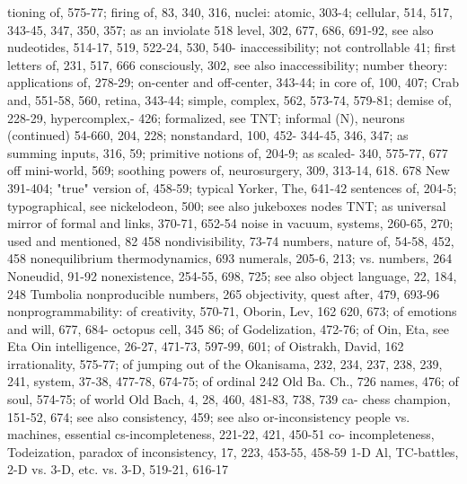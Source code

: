 tioning of, 575-77; firing of, 83, 340, 316,      nuclei: atomic, 303-4; cellular, 514, 517,
343-45, 347, 350, 357; as an inviolate            518
level, 302, 677, 686, 691-92, see also            nudeotides, 514-17, 519, 522-24, 530, 540-
inaccessibility;        not       controllable    41; first letters of, 231, 517, 666
consciously, 302, see also inaccessibility;       number theory: applications of, 278-29;
on-center and off-center, 343-44; in              core of, 100, 407; Crab and, 551-58, 560,
retina,     343-44;      simple,     complex,     562, 573-74, 579-81; demise of, 228-29,
hypercomplex,-                                    426; formalized, see TNT; informal (N),
neurons (continued)                               54-660, 204, 228; nonstandard, 100, 452-
344-45, 346, 347; as summing inputs, 316,         59; primitive notions of, 204-9; as scaled-
340, 575-77, 677                                  off mini-world, 569; soothing powers of,
neurosurgery, 309, 313-14, 618. 678 New           391-404; "true" version of, 458-59; typical
Yorker, The, 641-42                               sentences of, 204-5; typographical, see
nickelodeon, 500; see also jukeboxes nodes        TNT; as universal mirror of formal
and links, 370-71, 652-54 noise in vacuum,        systems, 260-65, 270; used and mentioned,
82                                                458
nondivisibility, 73-74                            numbers, nature of, 54-58, 452, 458
nonequilibrium thermodynamics, 693                numerals, 205-6, 213; vs. numbers, 264
Noneudid, 91-92
nonexistence, 254-55, 698, 725; see also          object language, 22, 184, 248
Tumbolia nonproducible numbers, 265               objectivity, quest after, 479, 693-96
nonprogrammability: of creativity, 570-71,        Oborin, Lev, 162
620, 673; of emotions and will, 677, 684-         octopus cell, 345
86;     of    Godelization,      472-76;     of   Oin, Eta, see Eta Oin
intelligence, 26-27, 471-73, 597-99, 601; of      Oistrakh, David, 162
irrationality, 575-77; of jumping out of the      Okanisama, 232, 234, 237, 238, 239, 241,
system, 37-38, 477-78, 674-75; of ordinal         242 Old Ba. Ch., 726
names, 476; of soul, 574-75; of world             Old Bach, 4, 28, 460, 481-83, 738, 739 ca-
chess champion, 151-52, 674; see also             consistency, 459; see also or-inconsistency
people       vs.     machines,        essential   cs-incompleteness, 221-22, 421, 450-51 co-
incompleteness, Todeization, paradox of           inconsistency, 17, 223, 453-55, 458-59 1-D
Al, TC-battles, 2-D vs. 3-D, etc.                 vs. 3-D, 519-21, 616-17
